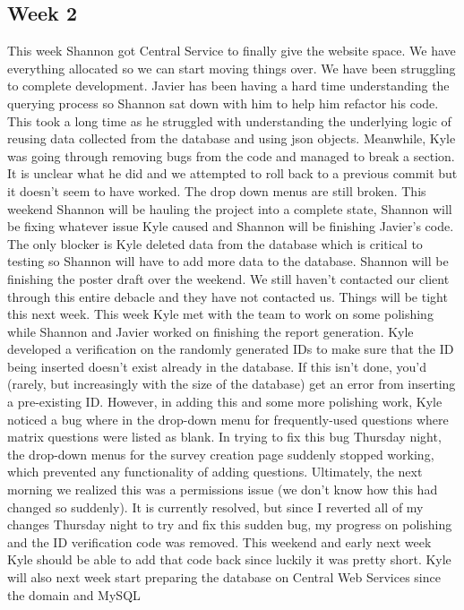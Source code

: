 \documentclass[letterpaper,10pt,serif,draftclsnofoot,onecolumn,compsoc,titlepage]{IEEEtran}
\begin{document}
\subsection{Week 2}
This week Shannon got Central Service to finally give the website space. We have everything
 allocated so we can start moving things over. We have been struggling to complete development.
 Javier has been having a hard time understanding the querying process so Shannon sat down with
 him to help him refactor his code. This took a long time as he struggled with understanding the
 underlying logic of reusing data collected from the database and using json objects. Meanwhile, Kyle
 was going through removing bugs from the code and managed to break a section. It is unclear
 what he did and we attempted to roll back to a previous commit but it doesn't seem to have worked.
 The drop down menus are still broken. This weekend Shannon will be hauling the project into a complete state,
 Shannon will be fixing whatever issue Kyle caused and Shannon will be finishing Javier's code.
 The only blocker is Kyle deleted data from the database which is critical to testing so Shannon will
 have to add more data to the database. Shannon will be finishing the poster draft over the weekend.
 We still haven't contacted our client through this entire debacle and they have not contacted us.
 Things will be tight this next week. 
 This week Kyle met with the team to work on some polishing while Shannon and Javier worked on finishing
 the report generation. Kyle developed a verification on the randomly generated IDs to make sure that the
 ID being inserted doesn't exist already in the database. If this isn't done, you'd (rarely, but increasingly
 with the size of the database) get an error from inserting a pre-existing ID.
However, in adding this and some more polishing work, Kyle noticed a bug where in the drop-down menu for
 frequently-used questions where matrix questions were listed as blank. In trying to fix this bug Thursday night,
 the drop-down menus for the survey creation page suddenly stopped working, which prevented any functionality
 of adding questions. Ultimately, the next morning we realized this was a permissions issue (we don't know how 
 this had changed so suddenly). It is currently resolved, but since I reverted all of my changes Thursday night
 to try and fix this sudden bug, my progress on polishing and the ID verification code was removed.
This weekend and early next week Kyle should be able to add that code back since luckily it was pretty short.
 Kyle will also next week start preparing the database on Central Web Services since the domain and MySQL
\end{document}
